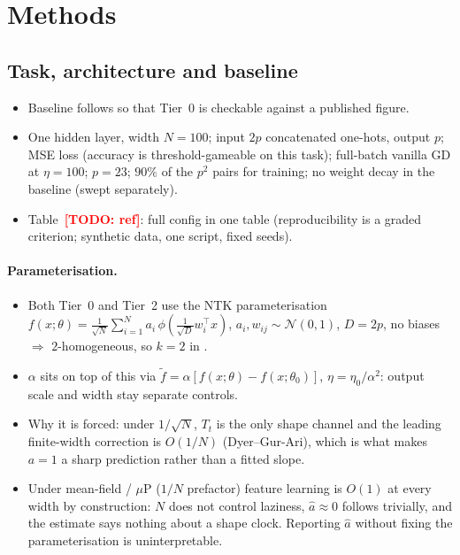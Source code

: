 \documentclass[a4paper,11pt]{article} %
\newcommand{\TODO}[1]{\textcolor{red}{\textbf{[TODO: #1]}}}
\begin{document}
\section{Methods}
\label{sec:methods}


\subsection{Task, architecture and baseline}
\begin{itemize}
	\item Baseline follows \citet[App.~8.3, arXiv v3]{kumar2024grokking} so that
		Tier~0 is checkable against a published figure.
	\item One hidden layer, width $N=100$; input $2p$ concatenated one-hots,
		output $p$; MSE loss (accuracy is threshold-gameable on this task);
		full-batch vanilla GD at $\eta=100$; $p=23$; $90\%$ of the $p^2$ pairs for
		training; no weight decay in the baseline (swept separately).
	
	\item Table~\TODO{ref}: full config in one table (reproducibility is a graded
		criterion; synthetic data, one script, fixed seeds).
\end{itemize}

\paragraph{Parameterisation.}
\begin{itemize}
	\item Both Tier~0 and Tier~2 use the NTK parameterisation
		$f(x;\theta)=\tfrac{1}{\sqrt N}\sum_{i=1}^{N}a_i\,
		\phi(\tfrac{1}{\sqrt D}w_i^\top x)$, $a_i,w_{ij}\sim\mathcal N(0,1)$,
		$D=2p$, no biases $\Rightarrow$ $2$-homogeneous, so $k=2$ in
		\citet{lewkowycz2020l2}.
	\item $\alpha$ sits on top of this via $\tilde f=\alpha[f(x;\theta)-f(x;\theta_0)]$,
		$\eta=\eta_0/\alpha^2$: output scale and width stay separate controls.
	\item Why it is forced: under $1/\sqrt N$, $T_t$ is the only shape channel and
		the leading finite-width correction is $O(1/N)$ (Dyer--Gur-Ari), which is
		what makes $a=1$ a sharp prediction rather than a fitted slope.
	\item Under mean-field / $\mu$P ($1/N$ prefactor) feature learning is $O(1)$ at
		every width by construction: $N$ does not control laziness,
		$\hat a\approx0$ follows trivially, and the estimate says nothing about a
		shape clock. Reporting $\hat a$ without fixing the parameterisation is
		uninterpretable.
\end{itemize}
\end{document}
